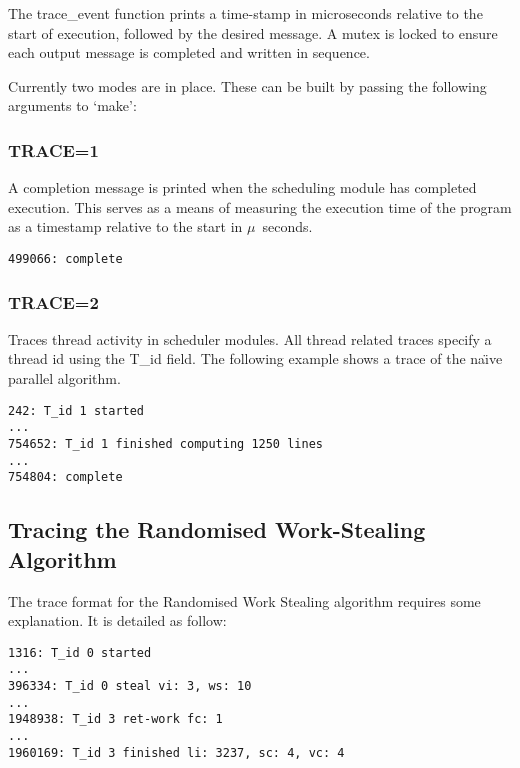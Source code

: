The trace\_event function prints a time-stamp in microseconds relative to the start of execution,
followed by the desired message. A \gls{mutex} is locked to ensure each output message
is completed and written in sequence.

Currently two modes are in place.
These can be built by passing the following arguments to `make':
\subsubsection*{TRACE=1}
            A completion message is printed when the scheduling module has completed execution.
            This serves as a means of measuring the execution time of the program as a timestamp
            relative to the start in \(\mu\)~seconds.
            
\begin{lstlisting}
499066: complete
\end{lstlisting}


\subsubsection*{TRACE=2}
            Traces thread activity in scheduler modules. 
            All thread related traces specify a thread id using the T\_id field.
            The following example shows a trace of the na\"{\i}ve parallel algorithm.
            
\begin{lstlisting}
242: T_id 1 started
...
754652: T_id 1 finished computing 1250 lines
...
754804: complete
\end{lstlisting}

\subsection*{Tracing the Randomised Work-Stealing Algorithm}

The trace format for the Randomised Work Stealing algorithm requires some explanation.
It is detailed as follow:
\newpage
\begin{lstlisting}[label = ls:wstraceeg,caption = Examples of the Four Traced Events for the Randomised Work-Stealing Scheme]
1316: T_id 0 started
...
396334: T_id 0 steal vi: 3, ws: 10
...
1948938: T_id 3 ret-work fc: 1
...
1960169: T_id 3 finished li: 3237, sc: 4, vc: 4
\end{lstlisting}

